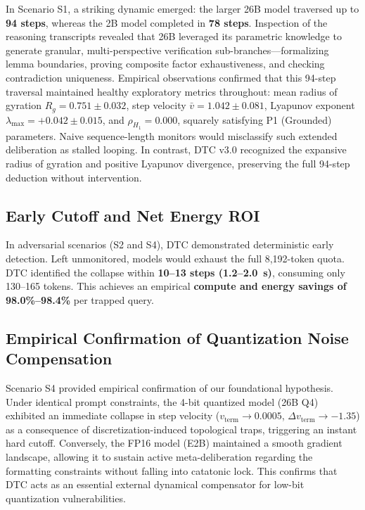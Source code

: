 \documentclass[11pt,a4paper]{article}
\begin{document}
In Scenario S1, a striking dynamic emerged: the larger 26B model traversed up to \textbf{94 steps}, whereas the 2B model completed in \textbf{78 steps}. Inspection of the reasoning transcripts revealed that 26B leveraged its parametric knowledge to generate granular, multi-perspective verification sub-branches---formalizing lemma boundaries, proving composite factor exhaustiveness, and checking contradiction uniqueness. Empirical observations confirmed that this 94-step traversal maintained healthy exploratory metrics throughout: mean radius of gyration $R_g = 0.751 \pm 0.032$, step velocity $\bar{v} = 1.042 \pm 0.081$, Lyapunov exponent $\lambda_{\max} = +0.042 \pm 0.015$, and $\rho_{H_1} = 0.000$, squarely satisfying P1 (Grounded) parameters. Naive sequence-length monitors would misclassify such extended deliberation as stalled looping. In contrast, DTC v3.0 recognized the expansive radius of gyration and positive Lyapunov divergence, preserving the full 94-step deduction without intervention.

\subsection{Early Cutoff and Net Energy ROI}

In adversarial scenarios (S2 and S4), DTC demonstrated deterministic early detection. Left unmonitored, models would exhaust the full 8,192-token quota. DTC identified the collapse within \textbf{10--13 steps (1.2--2.0~s)}, consuming only 130--165 tokens. This achieves an empirical \textbf{compute and energy savings of 98.0\%--98.4\%} per trapped query.

\subsection{Empirical Confirmation of Quantization Noise Compensation}

Scenario S4 provided empirical confirmation of our foundational hypothesis. Under identical prompt constraints, the 4-bit quantized model (26B Q4) exhibited an immediate collapse in step velocity ($v_{\mathrm{term}} \to 0.0005$, $\Delta v_{\mathrm{term}} \to -1.35$) as a consequence of discretization-induced topological traps, triggering an instant hard cutoff. Conversely, the FP16 model (E2B) maintained a smooth gradient landscape, allowing it to sustain active meta-deliberation regarding the formatting constraints without falling into catatonic lock. This confirms that DTC acts as an essential external dynamical compensator for low-bit quantization vulnerabilities.
\end{document}
